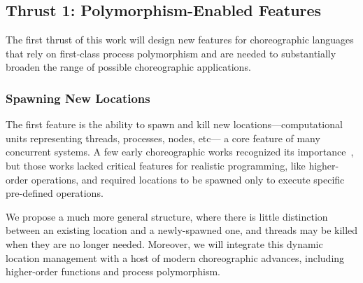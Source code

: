 
\subsection{Thrust 1: Polymorphism-Enabled Features}
\label{sec:t1}

The first thrust of this work will design new features for choreographic languages
that rely on first-class process polymorphism and
are needed to substantially broaden the range of possible choreographic applications.

\subsubsection{Spawning New Locations}
\label{sec:spawning}

The first feature is the ability to spawn and kill new locations---computational units representing threads, processes, nodes, etc---%
a core feature of many concurrent systems.
A few early choreographic works recognized its importance~\citep{CarboneM13,CruzFilipeM16a},
but those works lacked critical features for realistic programming, like higher-order operations,
and required locations to be spawned only to execute specific pre-defined operations.

We propose a much more general structure, where there is little distinction between an existing location and a newly-spawned one,
and threads may be killed when they are no longer needed.
Moreover, we will integrate this dynamic location management with a host of modern choreographic advances,
including higher-order functions and process polymorphism.

